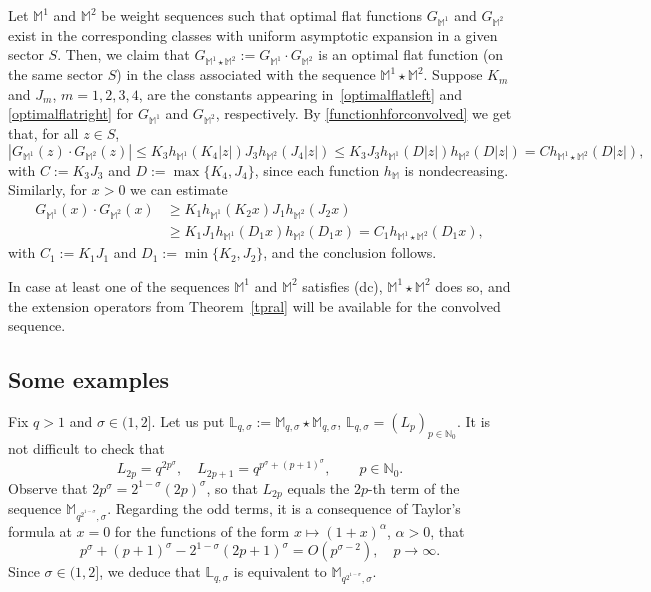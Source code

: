 \documentclass[11pt,a4paper]{article}
\theoremstyle{plain}
\theoremstyle{definition}
\newcommand{\N}{\mathbb{N}}
\newcommand{\M}{\mathbb{M}}
\def\L{\mathbb{L}}
\def\Ms{{\mathbb{M}}_{q,\sigma}}
\begin{document}
Let $\mathbb{M}^1$ and $\mathbb{M}^2$ be weight sequences such that optimal flat functions $G_{\mathbb{M}^1}$ and $G_{\mathbb{M}^2}$ exist in the corresponding classes with uniform asymptotic expansion in a given sector $S$. Then, we claim that $G_{\mathbb{M}^1\star\mathbb{M}^2}:=G_{\mathbb{M}^1}\cdot G_{\mathbb{M}^2}$ is an optimal flat function (on the same sector $S$) in the class associated with the sequence $\mathbb{M}^1\star\mathbb{M}^2$.
Suppose $K_m$ and $J_m$, $m=1,2,3,4$, are the constants appearing in~\eqref{optimalflatleft} and \eqref{optimalflatright}
for $G_{\mathbb{M}^1}$ and $G_{\mathbb{M}^2}$, respectively. By \eqref{functionhforconvolved} we get that, for all $z\in S$,
$$|G_{\mathbb{M}^1}(z)\cdot G_{\mathbb{M}^2}(z)|\le K_3 h_{\mathbb{M}^1}(K_4|z|) J_3h_{\mathbb{M}^2}(J_4|z|)\le K_3J_3 h_{\mathbb{M}^1}(D|z|)h_{\mathbb{M}^2}(D|z|)= Ch_{\mathbb{M}^1\star\mathbb{M}^2}(D|z|),$$
with $C:=K_3J_3$ and $D:=\max\{K_4,J_4\}$, since each function $h_{\mathbb{M}}$ is nondecreasing. Similarly, for $x>0$ we can estimate
\begin{align*}
G_{\mathbb{M}^1}(x)\cdot G_{\mathbb{M}^2}(x)&\ge K_1 h_{\mathbb{M}^1}(K_2x) J_1h_{\mathbb{M}^2}(J_2x)\\
&\ge K_1J_1 h_{\mathbb{M}^1}(D_1x)h_{\mathbb{M}^2}(D_1x)= C_1h_{\mathbb{M}^1\star\mathbb{M}^2}(D_1x),
\end{align*}
with $C_1:=K_1J_1$ and $D_1:=\min\{K_2,J_2\}$, and the conclusion follows.

In case at least one of the sequences $\M^1$ and $\M^2$ satisfies (dc), $\mathbb{M}^1\star\mathbb{M}^2$ does so, and the extension operators from Theorem~\ref{tpral} will be available for the convolved sequence.

\subsection{Some examples}\label{convolveexamplesect}

Fix $q>1$ and $\sigma\in(1,2]$. Let us put $\L_{q,\sigma}:=\Ms\star\Ms$, $\L_{q,\sigma}=(L_p)_{p\in\N_0}$. It is not difficult to check that
$$
L_{2p}=q^{2p^{\sigma}},\quad L_{2p+1}=q^{{p^\sigma}+(p+1)^\sigma},
\qquad p\in\N_0.
$$
Observe that $2p^\sigma=2^{1-\sigma}(2p)^\sigma$, so that $L_{2p}$ equals the $2p$-th term of the sequence $\M_{q^{2^{1-\sigma}},\sigma}$. Regarding the odd terms, it is a consequence of Taylor's formula at $x=0$ for the functions of the form $x\mapsto (1+x)^{\alpha}$, $\alpha>0$, that
$$
p^{\sigma}+(p+1)^\sigma-2^{1-\sigma}(2p+1)^\sigma=O(p^{\sigma-2}),\quad p\to\infty.
$$
Since $\sigma\in(1,2]$, we deduce that $\L_{q,\sigma}$ is equivalent to $\M_{q^{2^{1-\sigma}},\sigma}$.
\end{document}
